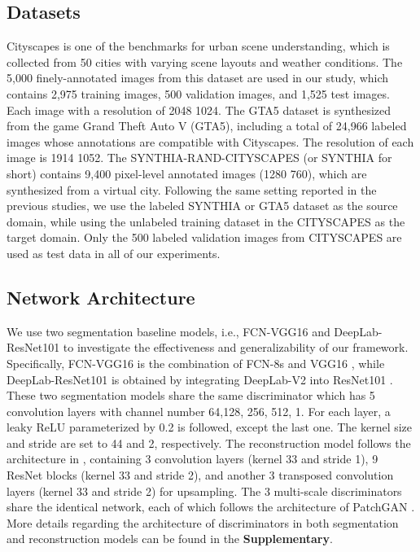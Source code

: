 \documentclass[runningheads]{llncs}
\begin{document}
	
	\subsection{Datasets}
	Cityscapes is one of the benchmarks for urban scene understanding, which is collected from 50 cities with varying scene layouts and weather conditions. The 5,000 finely-annotated images from this dataset are used in our study, which contains 2,975 training images, 500 validation images, and 1,525 test images. Each image with a resolution of 2048  1024. The GTA5 dataset is synthesized from the game Grand Theft Auto V (GTA5), including a total of 24,966 labeled images whose annotations are compatible with Cityscapes. The resolution of each image is 1914  1052. The SYNTHIA-RAND-CITYSCAPES (or SYNTHIA for short) contains 9,400 pixel-level annotated images (1280  760), which are synthesized from a virtual city. Following the same setting reported in the previous studies, we use the labeled SYNTHIA or GTA5 dataset as the source domain, while using the unlabeled training dataset in the CITYSCAPES as the target domain. Only the 500 labeled validation images from CITYSCAPES are used as test data in all of our experiments.
	
	\subsection{Network Architecture}
	We use two segmentation baseline models, i.e., FCN-VGG16 and DeepLab-ResNet101 to investigate the effectiveness and generalizability of our framework. Specifically, FCN-VGG16 is the combination of FCN-8s \cite{long2015fully} and VGG16 \cite{simonyan2014very}, while DeepLab-ResNet101 is obtained by integrating DeepLab-V2 \cite{chen2018deeplab} into ResNet101 \cite{he2016deep}. These two segmentation models share the same discriminator which has 5 convolution layers with channel number {64,128, 256, 512, 1}. For each layer, a leaky ReLU parameterized by 0.2 is followed, except the last one. The kernel size and stride are set to 44 and 2, respectively. The reconstruction model follows the architecture in \cite{johnson2016perceptual}, containing 3 convolution layers (kernel 33 and stride 1), 9 ResNet blocks (kernel 33 and stride 2), and another 3 transposed convolution layers (kernel 33 and stride 2) for upsampling. The 3 multi-scale discriminators share the identical network, each of which follows the architecture of PatchGAN \cite{isola2017image}. More details regarding the architecture of discriminators in both segmentation and reconstruction models can be found in the \textbf{Supplementary}.
	
\end{document}

